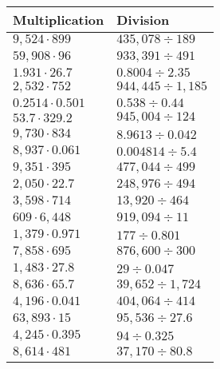 \begin{longtable}[]{@{}ll@{}}
\toprule
Multiplication & Division\tabularnewline
\midrule
\endhead
\(9,524\cdot899\) & \(435,078÷189\)\tabularnewline
\(59,908\cdot96\) & \(933,391÷491\)\tabularnewline
\(1.931\cdot26.7\) & \(0.8004÷2.35\)\tabularnewline
\(2,532\cdot752\) & \(944,445÷1,185\)\tabularnewline
\(0.2514\cdot0.501\) & \(0.538÷0.44\)\tabularnewline
\(53.7\cdot329.2\) & \(945,004÷124\)\tabularnewline
\(9,730\cdot834\) & \(8.9613÷0.042\)\tabularnewline
\(8,937\cdot0.061\) & \(0.004814÷5.4\)\tabularnewline
\(9,351\cdot395\) & \(477,044÷499\)\tabularnewline
\(2,050\cdot22.7\) & \(248,976÷494\)\tabularnewline
\(3,598\cdot714\) & \(13,920÷464\)\tabularnewline
\(609\cdot6,448\) & \(919,094÷11\)\tabularnewline
\(1,379\cdot0.971\) & \(177÷0.801\)\tabularnewline
\(7,858\cdot695\) & \(876,600÷300\)\tabularnewline
\(1,483\cdot27.8\) & \(29÷0.047\)\tabularnewline
\(8,636\cdot65.7\) & \(39,652÷1,724\)\tabularnewline
\(4,196\cdot0.041\) & \(404,064÷414\)\tabularnewline
\(63,893\cdot15\) & \(95,536÷27.6\)\tabularnewline
\(4,245\cdot0.395\) & \(94÷0.325\)\tabularnewline
\(8,614\cdot481\) & \(37,170÷80.8\)\tabularnewline
\bottomrule
\end{longtable}
